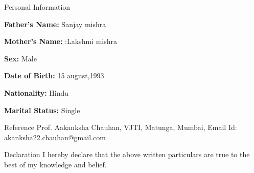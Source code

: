 \documentclass{resume} %
\begin{document}
\begin{rSection}{Personal Information}
	\item \textbf{Father’s Name:} Sanjay mishra
	\item \textbf{Mother’s Name: } :Lakshmi mishra
	\item \textbf{Sex:} Male
	\item \textbf{Date of Birth:} 15 august,1993 
	\item \textbf{Nationality: } Hindu
	\item \textbf{Marital Status:}	Single
\end{rSection}
\newpage
\begin{rSection}{Reference}
	Prof. Aakanksha Chauhan,
	\newline
	VJTI, Matunga, Mumbai,
	\newline
	Email Id: akanksha22.chauhan@gmail.com
	
\end{rSection}
\begin{rSection}{Declaration}
	I hereby declare that the above written particulars are true to the best of my knowledge and belief.
\end{rSection}
\end{document}
